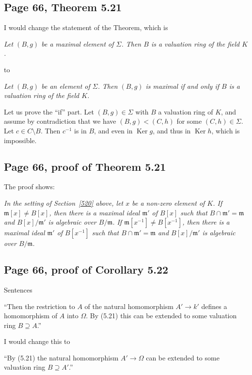 \documentclass[parskip=half,fontsize=12pt]{scrartcl}%
\newcommand{\mf}{\mathfrak}
\newcommand{\mmm}{\mf m}
\newcommand{\Ker}{\operatorname{Ker}}\newcommand{\Coker}{\operatorname{Coker}}
\begin{document}
\subsection{Page 66, Theorem 5.21}\label{521}%

I would change the statement of the Theorem, which is

\emph{Let $(B,g)$ be a maximal element of $\Sigma$. Then $B$ is a valuation ring of the field $K$.}

to 

\emph{Let $(B,g)$ be an element of $\Sigma$. Then $(B,g)$ is maximal if and only if $B$ is a valuation ring of the field $K$.}

Let us prove the ``if'' part. Let $(B,g)\in\Sigma$ with $B$ a valuation ring of $K$, and assume by contradiction that we have $(B,g)<(C,h)$ for some $(C,h)\in\Sigma$. Let $c\in C\setminus B$. Then $c^{-1}$ is in $B$, and even in $\Ker g$, and thus in $\Ker h$, which is impossible. 

\subsection{Page 66, proof of Theorem 5.21}\label{521p}%

The proof shows:

\emph{In the setting of Section~\ref{520} above, let $x$ be a non-zero element of $K$. If $\mmm[x]\ne B[x]$, then there is a maximal ideal $\mmm'$ of $B[x]$ such that $B\cap\mmm'=\mmm$ %
and $B[x]/\mmm'$ is algebraic over $B/\mmm$. If $\mmm[x^{-1}]\ne B[x^{-1}]$, then there is a maximal ideal $\mmm'$ of $B[x^{-1}]$ such that $B\cap\mmm'=\mmm$ %
and $B[x]/\mmm'$ is algebraic over $B/\mmm$.}

\subsection{Page 66, proof of Corollary 5.22}%

Sentences

``Then the restriction to $A$ of the natural homomorphism $A'\to k'$ defines a homomorphism of $A$ into $\Omega$. By (5.21) this can be extended to some valuation ring $B\supseteq A$.''

I would change this to 

``By (5.21) the natural homomorphism $A'\to\Omega$ can be extended to some valuation ring $B\supseteq A'$.'' %
\end{document}
